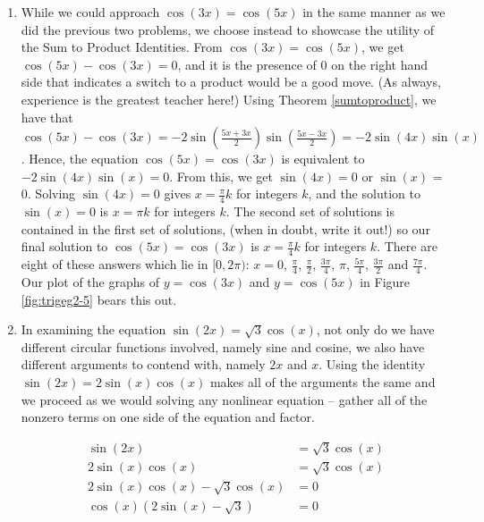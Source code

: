 {\begin{enumerate}
\item  While we could approach  $\cos(3x) = \cos(5x)$ in the same manner as we did the previous two problems, we choose instead to showcase the utility of the Sum to Product Identities.  From $\cos(3x) = \cos(5x)$, we get $\cos(5x) - \cos(3x) = 0$, and it is the presence of $0$ on the right hand side that indicates a switch to a product would be a good move. (As always, experience is the greatest teacher here!)  Using Theorem \ref{sumtoproduct}, we have that $\cos(5x) - \cos(3x)  = - 2 \sin\left( \frac{5x + 3x}{2}\right)\sin\left( \frac{5x - 3x}{2}\right) = -2 \sin(4x)\sin(x)$.  Hence, the equation $\cos(5x) = \cos(3x)$ is equivalent to $-2 \sin(4x) \sin(x) = 0$.  From this, we get $\sin(4x) = 0$ or $\sin(x)$ = 0.  Solving $\sin(4x) = 0$ gives $x = \frac{\pi}{4} k$ for integers $k$, and the solution to $\sin(x) = 0$ is $x = \pi k$ for integers $k$.  The second set of solutions is contained in the first set of solutions, (when in doubt, write it out!) so our final solution to $\cos(5x) = \cos(3x)$ is $x = \frac{\pi}{4} k$ for integers $k$.  There are eight of these answers which lie in $[0,2\pi)$:  $x = 0$, $\frac{\pi}{4}$, $\frac{\pi}{2}$, $\frac{3\pi}{4}$, $\pi$, $\frac{5\pi}{4}$, $\frac{3\pi}{2}$ and $\frac{7\pi}{4}$.  Our plot of the graphs of $y = \cos(3x)$ and $y = \cos(5x)$ in Figure \ref{fig:trigeg2-5}  bears this out. 


\item  In examining the equation   $\sin(2x) =\sqrt{3} \cos(x)$, not only do we have different circular functions involved, namely sine and cosine, we also have different arguments to contend with, namely $2x$ and $x$.  Using the identity $\sin(2x) = 2 \sin(x) \cos(x)$ makes all of the arguments the same and we proceed as we would solving any nonlinear equation -- gather all of the nonzero terms on one side of the equation and factor.

\drawexampleline

\begin{align*}
\sin(2x) & =  \sqrt{3} \cos(x)  \\
2 \sin(x) \cos(x) & =  \sqrt{3} \cos(x)   \tag*{($\sin(2x) = 2\sin(x) \cos(x)$)} \\
2\sin(x) \cos(x) - \sqrt{3} \cos(x) & =  0  \\
\cos(x) (2 \sin(x) - \sqrt{3}) & =  0 
\end{align*}


\end{enumerate}}
